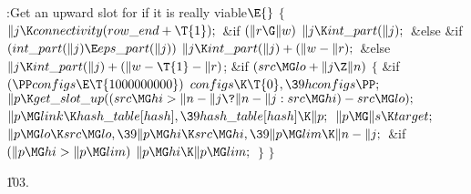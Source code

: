 \B{}:Get an upward slot for  if it is
really viable\X${}\E{}$\6
${}\{{}$\1\6
${}\|j\K\\{connectivity}(\\{row\_end}+\T{1});{}$\6
\&{if} ${}(\|r\G\|w){}$\1\5
${}\|j\K\\{int\_part}(\|j);{}$\2\6
\&{else} \&{if} ${}(\\{int\_part}(\|j)\E\\{eps\_part}(\|j)){}$\1\5
${}\|j\K\\{int\_part}(\|j)+(\|w-\|r);{}$\2\6
\&{else}\1\5
${}\|j\K\\{int\_part}(\|j)+(\|w-\T{1}-\|r){}$;\2\6
\&{if} ${}(\\{src}\MG\\{lo}+\|j\Z\|n){}$\5
${}\{{}$\1\6
\&{if} ${}(\PP\\{configs}\E\T{1000000000}){}$\1\5
${}\\{configs}\K\T{0},\39\\{hconfigs}\PP;{}$\2\6
${}\|p\K\\{get\_slot\_up}((\\{src}\MG\\{hi}>\|n-\|j\?\|n-\|j:\\{src}\MG\\{hi})-%
\\{src}\MG\\{lo});{}$\6
${}\|p\MG\\{link}\K\\{hash\_table}[\\{hash}],\39\\{hash\_table}[\\{hash}]\K%
\|p;{}$\6
${}\|p\MG\|s\K\\{target};{}$\6
${}\|p\MG\\{lo}\K\\{src}\MG\\{lo},\39\|p\MG\\{hi}\K\\{src}\MG\\{hi},\39\|p\MG%
\\{lim}\K\|n-\|j;{}$\6
\&{if} ${}(\|p\MG\\{hi}>\|p\MG\\{lim}){}$\1\5
${}\|p\MG\\{hi}\K\|p\MG\\{lim};{}$\2\6
\4${}\}{}$\2\6
\4${}\}{}$\2\par
\U103.\fi

